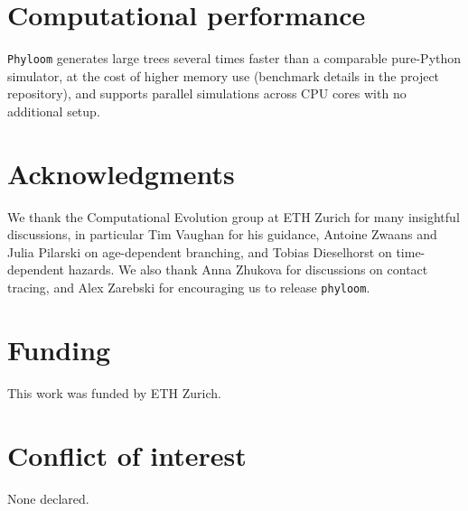\documentclass[11pt]{article}
\begin{document}
\section*{Computational performance}
\texttt{Phyloom} generates large trees several times faster than a comparable
pure-Python simulator, at the cost of higher memory use (benchmark details
in the project repository), and supports parallel simulations across CPU cores
with no additional setup.

\section*{Acknowledgments}
We thank the Computational Evolution group at ETH Zurich for many insightful
discussions, in particular Tim Vaughan for his guidance, Antoine Zwaans and
Julia Pilarski on age-dependent branching, and Tobias Dieselhorst on
time-dependent hazards. We also thank Anna Zhukova for discussions on contact
tracing, and Alex Zarebski for encouraging us to release \texttt{phyloom}.

\section*{Funding}
This work was funded by ETH Zurich.

\section*{Conflict of interest}
None declared.



\end{document}
